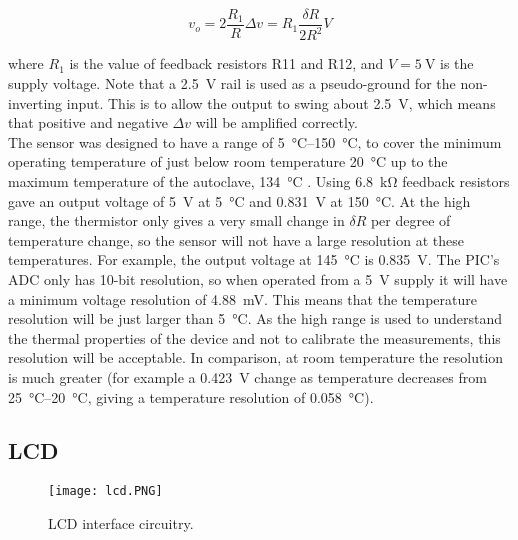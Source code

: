 \begin{equation}
v_o = 2 \frac{R_1}{R} \Delta v =R_1 \frac{\delta R}{2 R^2}V
\end{equation}

where $R_1$ is the value of feedback resistors R11 and R12, and $V=\SI{5}{\volt}$ is the supply voltage. Note that a \SI{2.5}{\volt} rail is used as a pseudo-ground for the non-inverting input. This is to allow the output to swing about \SI{2.5}{\volt}, which means that positive and negative $\Delta v$ will be amplified correctly.\\

The sensor was designed to have a range of \SIrange{5}{150}{\celsius}, to cover the minimum operating temperature of just below room temperature \SI{20}{\celsius} up to the maximum temperature of the autoclave, \SI{134}{\celsius} \cite{nhs_autoclave}. Using \SI{6.8}{\kilo\ohm} feedback resistors gave an output voltage of \SI{5}{\volt} at \SI{5}{\celsius} and \SI{0.831}{\volt} at \SI{150}{\celsius}. At the high range, the thermistor only gives a very small change in $\delta R$ per degree of temperature change, so the sensor will not have a large resolution at these temperatures. For example, the output voltage at \SI{145}{\celsius} is \SI{0.835}{\volt}. The PIC's ADC only has 10-bit resolution, so when operated from a \SI{5}{\volt} supply it will have a minimum voltage resolution of \SI{4.88}{\milli\volt}. This means that the temperature resolution will be just larger than \SI{5}{\celsius}. As the high range is used to understand the thermal properties of the device and not to calibrate the measurements, this resolution will be acceptable. In comparison, at room temperature the resolution is much greater (for example a \SI{0.423}{\volt} change as temperature decreases from \SIrange{25}{20}{\celsius}, giving a temperature resolution of \SI{0.058}{\celsius}).\\





\subsection{LCD}
\begin{figure}[htbp]
	\centering
	\texttt{[image: lcd.PNG]}
	\caption{LCD interface circuitry.}
	\label{fig: lcd schematic}
\end{figure}

